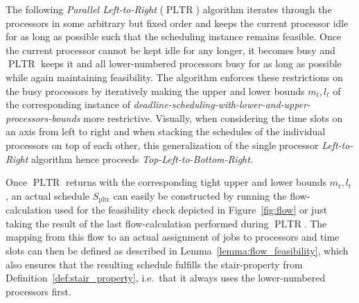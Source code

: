 \documentclass[a4paper]{article}
\DeclareMathOperator{\pltr}{pltr}
\DeclareMathOperator{\PLTR}{PLTR}
\begin{document}
The following \emph{Parallel Left-to-Right} ($\PLTR$) algorithm iterates through the processors in some arbitrary but fixed order and keeps the current processor idle for as long as possible such that the scheduling instance remains feasible.
Once the current processor cannot be kept idle for any longer, it becomes busy and $\PLTR$ keeps it and all lower-numbered processors busy for as long as possible while again maintaining feasibility.
The algorithm enforces these restrictions on the busy processors by iteratively making the upper and lower bounds $m_t, l_t$ of the corresponding instance of \emph{deadline-scheduling-with-lower-and-upper-processors-bounds} more restrictive.
Visually, when considering the time slots on an axis from left to right and when stacking the schedules of the individual processors on top of each other, this generalization of the single processor \emph{Left-to-Right} algorithm hence proceeds \emph{Top-Left-to-Bottom-Right}.

Once $\PLTR$ returns with the corresponding tight upper and lower bounds $m_t, l_t$ , an actual schedule $S_{\pltr}$ can easily be constructed by running the flow-calculation used for the feasibility check depicted in Figure~\ref{fig:flow} or just taking the result of the last flow-calculation performed during $\PLTR$.
The mapping from this flow to an actual assignment of jobs to processors and time slots can then be defined as described in Lemma~\ref{lemma:flow_feasibility}, which also ensures that the resulting schedule fulfills the stair-property from Definition~\ref{def:stair_property}, i.e.\ that it always uses the lower-numbered processors first.
\end{document}

